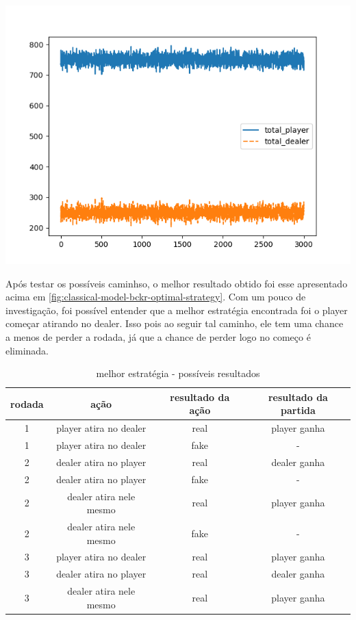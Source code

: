 \documentclass{article}
\begin{document}
\begin{center}
	\includegraphics[scale=0.6]{optimal_player_strategy.png}
	\label{fig:classical-model-bckr-optimal-strategy}
\end{center}

Após testar os possíveis caminhso, o melhor resultado obtido foi esse apresentado acima em \ref{fig:classical-model-bckr-optimal-strategy}. Com um pouco de investigação, foi possível entender que a melhor estratégia encontrada foi o player começar atirando no dealer. Isso pois ao seguir tal caminho, ele tem uma chance a menos de perder a rodada, já que a chance de perder logo no começo é eliminada.




\begin{table}[!h]
	\begin{center}
		\begin{tabular}{ |c|c|c|c| } 
			\hline
			rodada & ação & resultado da ação & resultado da partida \\
			\hline
			1 & player atira no dealer  & real & player ganha\\
			\hline
			1 & player atira no dealer  & fake & -\\
			\hline
			2 & dealer atira no player  & real & dealer ganha\\
			\hline
			2 & dealer atira no player  & fake & -\\
			\hline
			2 & dealer atira nele mesmo  & real & player ganha\\
			\hline
			2 & dealer atira nele mesmo  & fake & -\\
			\hline
			3 & player atira no dealer  & real & player ganha\\
			\hline
			3 & dealer atira no player & real & dealer ganha\\
			\hline
			3 & dealer atira nele mesmo  & real & player ganha\\
			\hline
		\end{tabular}
		\caption{melhor estratégia - possíveis resultados}
	\end{center}
\end{table}
\end{document}

